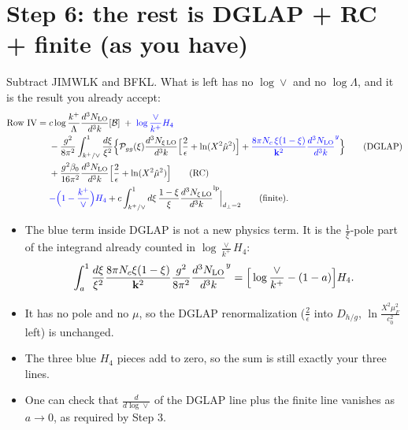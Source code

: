 \documentclass[10pt]{article}
\numberwithin{equation}{section}
\newcommand{\NLO}[1]{\frac{d^3N_{#1}}{d^3k}}
\newcommand{\new}[1]{{\color{blue}#1}}
\begin{document}
\section{Step 6: the rest is DGLAP + RC + finite (as you have)}
Subtract JIMWLK and BFKL. What is left has no $\log\vee$ and no $\log\Lambda$, and it is the result you already accept:
\begin{equation}
\begin{aligned}
\text{Row IV}={}&c\log\frac{k^+}{\Lambda}\NLO{\rm LO}[\mathcal B]\;+\;\new{\log\frac{\vee}{k^+}H_4}\\
&-\frac{g^2}{8\pi^2}\int_{k^+/\vee}^1\frac{d\xi}{\xi^2}\Big\{\mathcal P_{gg}(\xi)\NLO{\xi\,\rm LO}\Big[\frac2\epsilon+\ln(X^2\hat\mu^2)\Big]+\new{\frac{8\pi N_c\,\xi(1-\xi)}{\mathbf k^2}\NLO{\rm LO}^{y}}\Big\}\qquad\text{(DGLAP)}\\
&+\frac{g^2\beta_0}{16\pi^2}\NLO{\rm LO}\Big[\frac2\epsilon+\ln(X^2\hat\mu^2)\Big]\qquad\text{(RC)}\\
&\new{-\Big(1-\frac{k^+}{\vee}\Big)H_4}+c\int_{k^+/\vee}^1d\xi\,\frac{1-\xi}{\xi}\NLO{\xi\,\rm LO}^{\rm lp}\Big|_{d_\perp=2}\qquad\text{(finite)}.
\end{aligned}
\end{equation}
\begin{itemize}
\item The blue term inside DGLAP is not a new physics term. It is the $\frac{1}{\xi}$-pole part of the integrand already counted in $\log\frac{\vee}{k^+}H_4$:
\begin{equation}
\int_a^1\frac{d\xi}{\xi^2}\frac{8\pi N_c\xi(1-\xi)}{\mathbf k^2}\frac{g^2}{8\pi^2}\NLO{\rm LO}^{y}=\Big[\log\frac{\vee}{k^+}-(1-a)\Big]H_4 .
\end{equation}
\item It has no pole and no $\mu$, so the DGLAP renormalization ($\frac2\epsilon$ into $D_{h/g}$, $\ln\frac{X^2\mu_F^2}{c_0^2}$ left) is unchanged.
\item The three blue $H_4$ pieces add to zero, so the sum is still exactly your three lines.
\item One can check that $\frac{d}{d\log\vee}$ of the DGLAP line plus the finite line vanishes as $a\to0$, as required by Step 3.
\end{itemize}
\end{document}
